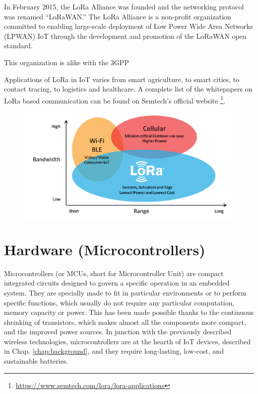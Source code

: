 		In February 2015, the LoRa Alliance was founded and the networking protocol was renamed “LoRaWAN.”
		The LoRa Alliance is a non-profit organization committed to enabling large-scale deployment of Low Power Wide Area Networks (LPWAN) IoT through the development and promotion of the LoRaWAN open standard.
		
		This organization is alike with the 3GPP 
		
		Applications of LoRa in IoT varies from smart agriculture, to smart cities, to contact tracing, to logistics and healthcare.
		A complete list of the whitepapers on LoRa based communication can be found on Semtech's official website \footnote{\url{https://www.semtech.com/lora/lora-applications}}.
		
		
		\begin{figure}[H]
			\centering
			\includegraphics[width=\textwidth]{resources/img/LoRa_Why_Range}
			\caption{}
		\end{figure}


\section{Hardware (Microcontrollers)}\label{sec:microcontrollers}

	Microcontrollers (or MCUs, short for Microcontroller Unit) are compact integrated circuits designed to govern a specific operation in an embedded system.
	They are specially made to fit in particular environments or to perform specific functions, which usually do not require any particular computation, memory capacity or power.
	This has been made possible thanks to the continuous shrinking of transistors, which makes almost all the components more compact, and the improved power sources.
	In junction with the previously described wireless technologies, microcontrollers are at the hearth of IoT devices, described in Chap. \ref{chap:background}, and they require long-lasting, low-cost, and sustainable batteries.
	
